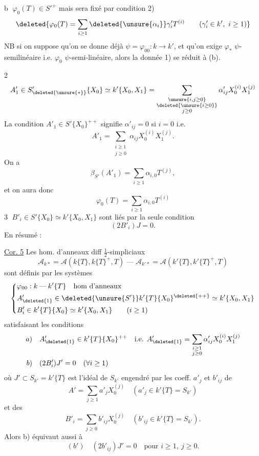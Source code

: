 \textcircled{b} $\varphi_0(T)\in S'^+$  mais sera fixé par condition 2)
\[
 \deleted{\varphi_0(T)=\sum_{i\geq1}\deleted{\unsure{\alpha_i}}\gamma'_iT^{(i)}\qquad(\gamma'_i\in k',\ i\geq1)}
\]
 NB si on suppose qu'on se donne déjà $\psi=\varphi_{00}:k\longrightarrow k'$, et qu'on exige $\varphi_*$ $\psi$-semilinéaire i.e. $\varphi_0$ $\psi$-semi-linéaire, alors la donnée 1) se réduit à (b).

\textcircled{2}
\[
 A'_1\in S'_{\deleted{\unsure{*}}}\{X_0\}\simeq k'\{X_0,X_1\}
 =\sum_{\substack{\unsure{i,j\geq0}\\\deleted{\unsure{i\geq0}}\\j\geq0}}\alpha'_{ij}X_0^{(i)}X_1^{(j)}
\]
La condition $A'_1\in S'\{X_0\}^{++}$ signifie $\alpha'_{ij}=0$ si $i=0$
i.e.
\[
 A'_1=\sum_{\substack{i\geq1\\j\geq0}}\alpha_{ij}X_0^{(i)}X_1^{(j)}.
\]
On a
\[
 \beta_{S'}(A'_1)=\sum_{i\geq1}\alpha_{i,0}T^{(j)},
\]
et on aura donc
\[
 \varphi_0(T)=\sum_{i\geq1}\alpha_{i,0}T^{(i)}
\]
\textcircled{3} $B'_i\in S'\{X_0\}\simeq k'\{X_0,X_1\}$ sont liés par la seule condition
\[
 (2B'_i)J=0.
\]
En résumé :

\uline{Cor. 5} Les hom. d'anneaux diff $\tfrac12$-simpliciaux
\[
 \mathcal A_{k*}=\mathcal A(k\{T\},k\{T\}^+,T)\mathbin{\text{---}}\mathcal A_{k'*}=\mathcal A(k'\{T\},k'\{T\}^+,T)
\]
sont définis par les systèmes 
\[
 \left\{\begin{aligned}
 &\varphi_{00}:k\mathbin{\text{---}}k'\{T\}\quad\text{hom d'anneaux}\\
 &A'_{\deleted{1}}\in\deleted{\unsure{S'}}k'\{T\}\{X_0\}^{\deleted{++}}\simeq k'\{X_0,X_1\}\\
 &B'_i\in k'\{T\}\{X_0\}\simeq k'\{X_0,X_1\}\qquad(i\geq1)
 \end{aligned}\right.
\]
satisfaisant les conditions
\[
 \begin{aligned}
 a)\quad&A'_{\deleted{1}}\in k'\{T\}\{X_0\}^{++}\quad\text{i.e. }A'_{\deleted{1}}=\sum_{\substack{i\geq1\\j\geq0}}\alpha'_{ij}X_0^{(i)}X_1^{(j)}\\
 b)\quad&(2B'_i)J'=0\quad(\forall i\geq1)
 \end{aligned}
\]
où $J'\subset S_{k'}=k'\{T\}$ est l'idéal de $S_{k'}$ engendré par les coeff. $a'_j$ et $b'_{ij}$
de
\[
 A'=\sum_{j\geq1}a'_jX_0^{(j)}\quad(a'_j\in k'\{T\}=S_{k'})
\]
et des
\[
 B'_i=\sum_{j\geq0}b'_{ij}X_0^{(j)}\quad(b'_{ij}\in k'\{T\}=S_{k'}).
\]
Alors b) équivaut aussi à
\[
 (b')\quad(2b'_{ij})J'=0\quad\text{pour }i\geq1,\ j\geq0.
\]
